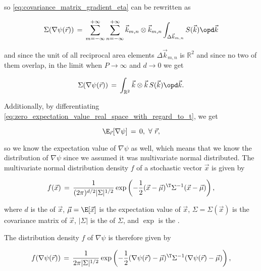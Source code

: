 so \eqref{eq:covariance_matrix_gradient_eta} can be rewritten as

\begin{equation}
\Sigma(\nabla\psi(\vec{r})) \,=\, \sum_{m=-\infty}^{+\infty}\sum_{n=-\infty}^{+\infty}\vec{k}_{m,n}\otimes\vec{k}_{m,n} \int_{\Delta\vec{k}_{m,n}}S(\vec{k})\opd\vec{k}
\end{equation}

and since the unit of all reciprocal area elements $\Delta\vec{k}_{m,n}$ is $\mathbb{R}^2$ and since no two of them overlap, in the limit when $P\to\infty$ and $d\to 0$ we get

\begin{equation} \label{eq:covariance_matrix_gradient_eta_final}
\Sigma(\nabla\psi(\vec{r})) \,=\, \int_{\mathbb{R}^2}\vec{k}\otimes\vec{k}\,S(\vec{k})\opd\vec{k}.
\end{equation}

Additionally, by differentiating \eqref{eq:zero_expectation_value_real_space_with_regard_to_t}, we get

\begin{equation} \label{eq:psi_of_r_expectation_value}
\E_{\vec{r}}[\nabla\psi] \,=\, 0,\ \forall\ \vec{r},
\end{equation}

so we know the expectation value of $\nabla\psi$ as well, which means that we know the distribution of $\nabla\psi$ since we assumed it was multivariate normal distributed. The multivariate normal distribution density $f$ of a stochastic vector $\vec{x}$ is given by

\begin{equation} \label{eq:multivariate_normal_distribution_density}
f(\vec{x}) \,=\, \frac{1}{(2\pi)^{d/2}|\Sigma|^{1/2}}\exp\left(-\frac{1}{2}(\vec{x}-\vec{\mu})^{\T}\Sigma^{-1}(\vec{x}-\vec{\mu})\right),
\end{equation}

where $d$ is the \dimensionality of $\vec{x}$, $\vec{\mu} = \E[\vec{x}]$ is the expectation value of $\vec{x}$, $\Sigma = \Sigma(\vec{x})$ is the covariance matrix of $\vec{x}$, $|\Sigma|$ is the \determinant of $\Sigma$, and $\exp$ is the .

The distribution density $f$ of $\nabla\psi$ is therefore given by

\begin{equation} \label{eq:psi_grad_distribution}
f(\nabla\psi(\vec{r})) \,=\, \frac{1}{2\pi|\Sigma|^{1/2}}\exp\left(-\frac{1}{2}(\nabla\psi(\vec{r})-\vec{\mu})^{\T}\Sigma^{-1}(\nabla\psi(\vec{r})-\vec{\mu})\right),
\end{equation}


